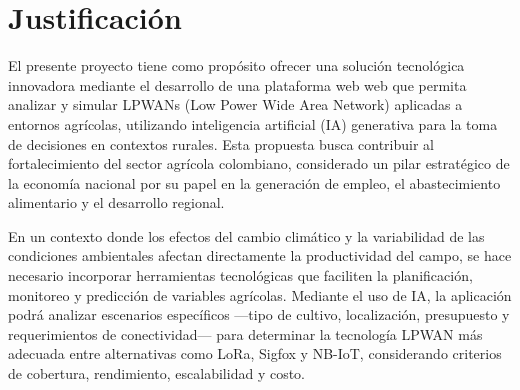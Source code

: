 \chapter{Justificación}

El presente proyecto tiene  como  propósito  ofrecer  una  solución  tecnológica
innovadora mediante el desarrollo de una plataforma web web que permita  analizar  y
simular LPWANs  (Low  Power  Wide  Area  Network)  aplicadas  a  entornos
agrícolas, utilizando inteligencia artificial (IA) generativa para  la  toma  de
decisiones  en  contextos  rurales.   Esta   propuesta   busca   contribuir   al
fortalecimiento del sector agrícola colombiano, considerado un pilar estratégico
de  la  economía  nacional  por  su  papel  en  la  generación  de  empleo,   el
abastecimiento alimentario y el desarrollo regional.

En un contexto donde los efectos del cambio climático y la variabilidad  de  las
condiciones ambientales afectan directamente la productividad del campo, se hace
necesario incorporar herramientas tecnológicas que faciliten  la  planificación,
monitoreo y predicción de  variables  agrícolas.  Mediante  el  uso  de  IA,  la
aplicación podrá analizar escenarios específicos —tipo de cultivo, localización,
presupuesto y requerimientos de conectividad— para determinar la tecnología LPWAN
más adecuada entre  alternativas  como  LoRa,  Sigfox  y  NB-IoT,  considerando
criterios de cobertura, rendimiento, escalabilidad y costo.

